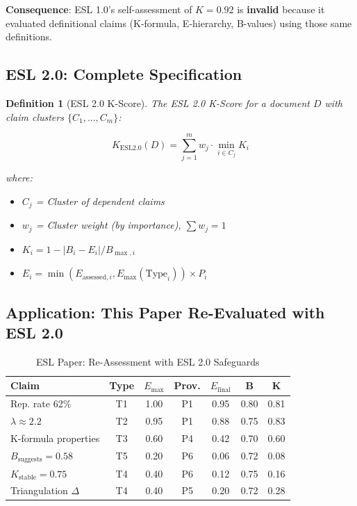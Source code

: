\documentclass[11pt,a4paper]{article}
\newtheorem{definition}{Definition}[section]
\begin{document}
\textbf{Consequence}: ESL 1.0's self-assessment of $K = 0.92$ is \textbf{invalid} because it evaluated definitional claims (K-formula, E-hierarchy, B-values) using those same definitions.

\subsection{ESL 2.0: Complete Specification}

\begin{definition}[ESL 2.0 K-Score]
\label{def:esl2-k}
The ESL 2.0 K-Score for a document $D$ with claim clusters $\{C_1, \ldots, C_m\}$:

\begin{equation}
K_{\text{ESL2.0}}(D) = \sum_{j=1}^{m} w_j \cdot \min_{i \in C_j} K_i
\end{equation}

where:
\begin{itemize}
    \item $C_j$ = Cluster of dependent claims
    \item $w_j$ = Cluster weight (by importance), $\sum w_j = 1$
    \item $K_i = 1 - |B_i - E_i| / B_{\max,i}$
    \item $E_i = \min(E_{\text{assessed},i}, E_{\max}(\text{Type}_i)) \times P_i$
\end{itemize}
\end{definition}

\subsection{Application: This Paper Re-Evaluated with ESL 2.0}

\begin{table}[h]
\centering
\caption{ESL Paper: Re-Assessment with ESL 2.0 Safeguards}
\label{tab:esl2-reassessment}
\begin{tabular}{lcccccc}
\toprule
\textbf{Claim} & \textbf{Type} & \textbf{$E_{\max}$} & \textbf{Prov.} & \textbf{$E_{\text{final}}$} & \textbf{B} & \textbf{K} \\
\midrule
Rep. rate 62\% & T1 & 1.00 & P1 & 0.95 & 0.80 & 0.81 \\
$\lambda \approx 2.2$ & T2 & 0.95 & P1 & 0.88 & 0.75 & 0.83 \\
K-formula properties & T3 & 0.60 & P4 & 0.42 & 0.70 & 0.60 \\
$B_{\text{suggests}} = 0.58$ & T5 & 0.20 & P6 & 0.06 & 0.72 & 0.08 \\
$K_{\text{stable}} = 0.75$ & T4 & 0.40 & P6 & 0.12 & 0.75 & 0.16 \\
Triangulation $\Delta$ & T4 & 0.40 & P5 & 0.20 & 0.72 & 0.28 \\
\bottomrule
\end{tabular}
\end{table}
\end{document}
